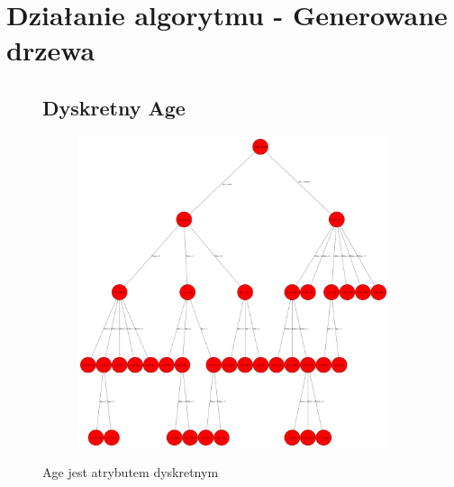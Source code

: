 \documentclass[12pt]{article}
\begin{document}
\section{Działanie algorytmu - Generowane drzewa}
\begin{figure}[h!]
	\subsection{Dyskretny Age}
	\centering
	\begin{subfigure}[b]{1\linewidth}
		\includegraphics[width=\linewidth]{Dyskretny.png}
	\end{subfigure}
	\label{fig:dyskretne}
	\caption{Age jest atrybutem dyskretnym}
\end{figure}
\end{document}
